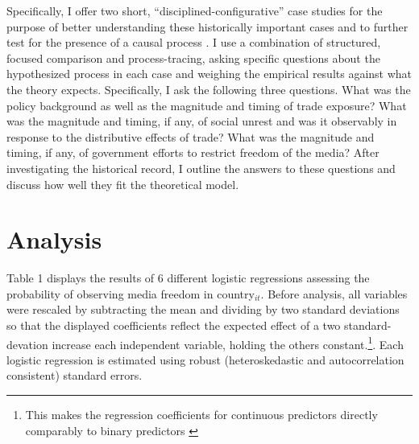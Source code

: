 \documentclass[12pt,a4paper]{article}\usepackage[]{graphicx}\usepackage[]{color}
\begin{document}
Specifically, I offer two short, “disciplined-configurative” case studies for the purpose of better understanding these historically important cases and to further test for the presence of a causal process \parencite[75]{george2005case}. I use a combination of structured, focused comparison and process-tracing, asking specific questions about the hypothesized process in each case and weighing the empirical results against what the theory expects. Specifically, I ask the following three questions. What was the policy background as well as the magnitude and timing of trade exposure? What was the magnitude and timing, if any, of social unrest and was it observably in response to the distributive effects of trade? What was the magnitude and timing, if any, of government efforts to restrict freedom of the media? After investigating the historical record, I outline the answers to these questions and discuss how well they fit the theoretical model.

\section{Analysis}

Table 1 displays the results of 6 different logistic regressions assessing the probability of observing media freedom in country$_{it}$. Before analysis, all variables were rescaled by subtracting the mean and dividing by two standard deviations so that the displayed coefficients reflect the expected effect of a two standard-devation increase each independent variable, holding the others constant.\footnote{This makes the regression coefficients for continuous predictors directly comparably to binary predictors \parencite{Gelman:2008gz}}. Each logistic regression is estimated using robust (heteroskedastic and autocorrelation consistent) standard errors.
\end{document}
